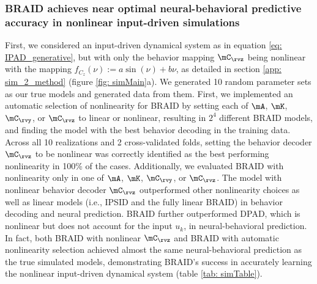 \documentclass{article} %
\newcommand{\ourmethod}{BRAID}
\newcommand{\ourmethodlinear}{linear \ourmethod}
\newcommand{\A}{\(\mA\)}
\newcommand{\K}{\(\mK\)}
\newcommand{\Cy}{\(\mC_{\rvy}\)}
\newcommand{\Cz}{\(\mC_{\rvz}\)}
\begin{document}

\subsubsection{\ourmethod{} achieves near optimal neural-behavioral predictive accuracy in nonlinear input-driven simulations}\label{sec: results_sim_localization}
First, we considered an input-driven dynamical system as in equation \ref{eq: IPAD_generative}, but with only the behavior mapping \Cz{} being nonlinear with the mapping \(f_{C_z}(\nu) := a \sin(\nu) + b \nu\), as detailed in section \ref{app: sim_2_method} (figure \ref{fig: simMain}a). We generated 10 random parameter sets as our true models and generated data from them. First, we implemented an automatic selection of nonlinearity for \ourmethod{} by setting each of \A{}, \K{}, \Cy{}, or \Cz{} to linear or nonlinear, resulting in \(2^4\) different \ourmethod{} models, and finding the model with the best behavior decoding in the training data. Across all 10 realizations and 2 cross-validated folds, setting the behavior decoder \Cz{} to be nonlinear was correctly identified as the best performing nonlinearity in 100\% of the cases. 
Additionally, we evaluated \ourmethod{} with nonlinearity only in one of \A{}, \K{}, \Cy{}, or \Cz{}. The model with nonlinear behavior decoder \Cz{} outperformed other nonlinearity choices as well as linear models (i.e., IPSID and the fully \ourmethodlinear{}) in behavior decoding and neural prediction. \ourmethod{} further outperformed DPAD, which is nonlinear but does not account for the input $u_k$, in neural-behavioral prediction. In fact, both \ourmethod{} with nonlinear \Cz{} and \ourmethod{} with automatic nonlinearity selection achieved almost the same neural-behavioral prediction as the true simulated models, demonstrating \ourmethod{}’s success in accurately learning the nonlinear input-driven dynamical system (table \ref{tab: simTable}).

\end{document}

